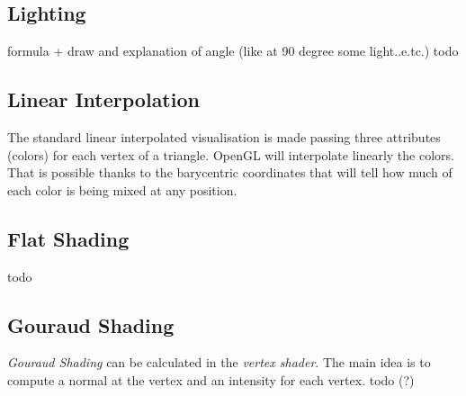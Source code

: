 
\subsection{Lighting}

formula + draw and explanation of angle (like at 90 degree some light..e.tc.)
todo


\subsection{Linear Interpolation}
The standard linear interpolated visualisation is made passing three attributes (colors) for each vertex of a triangle. OpenGL will interpolate linearly the colors. That is possible thanks to the barycentric coordinates that will tell how much of each color is being mixed at any position.


\subsection{Flat Shading}
todo


\subsection{Gouraud Shading}
\textit{Gouraud Shading} can be calculated in the \textit{vertex shader}. The main idea is to compute a normal at the vertex and an intensity for each vertex.
todo (?)



